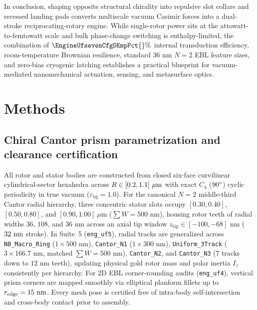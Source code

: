 \documentclass[11pt,a4paper]{article}
\begin{document}
In conclusion, shaping opposite structural chirality into repulsive slot collars and recessed landing pads converts multiscale vacuum Casimir forces into a dual-stroke reciprocating-rotary engine. While single-rotor power sits at the attowatt-to-femtowatt scale and bulk phase-change switching is enthalpy-limited, the combination of $\EngineUfsevenCfgDEmpPct{}\%$ internal transduction efficiency, room-temperature Brownian resilience, standard $36\text{ nm}$ $N=2$ EBL feature sizes, and zero-bias cryogenic latching establishes a practical blueprint for vacuum-mediated nanomechanical actuation, sensing, and metasurface optics.

\section*{Methods}

\subsection*{Chiral Cantor prism parametrization and clearance certification}
All rotor and stator bodies are constructed from closed six-face curvilinear cylindrical-sector hexahedra across $R \in [0.2{}, 1.1{}]\ \mu\text{m}$ with exact $C_4$ ($90{}^\circ$) cyclic periodicity in true vacuum ($\varepsilon_{\mathrm{bg}}=1.0$). For the canonical $N=2$ middle-third Cantor radial hierarchy, three concentric stator slots occupy $[0.30,0.40]$, $[0.50,0.80]$, and $[0.90,1.00]\ \mu\text{m}$ ($\sum W = 500\text{ nm}$), housing rotor teeth of radial widths $36$, $108$, and $36\text{ nm}$ across an axial tip window $z_{\mathrm{tip}} \in [-100, -68]\text{ nm}$ ($32{}\text{ nm}$ stroke). In Suite~5 (\texttt{eng\_uf5}), radial tracks are generalized across \texttt{N0\_Macro\_Ring} ($1\times 500\text{ nm}$), \texttt{Cantor\_N1} ($1\times 300\text{ nm}$), \texttt{Uniform\_3Track} ($3\times 166.7\text{ nm}$, matched $\sum W = 500\text{ nm}$), \texttt{Cantor\_N2}, and \texttt{Cantor\_N3} ($7$ tracks down to $12\text{ nm}$ teeth), updating physical gold rotor mass and polar inertia $I_z$ consistently per hierarchy. For 2D EBL corner-rounding audits (\texttt{eng\_uf4}), vertical prism corners are mapped smoothly via elliptical planform fillets up to $r_{\mathrm{edge}} = 15{}\text{ nm}$. Every mesh pose is certified free of intra-body self-intersection and cross-body contact prior to assembly.
\end{document}
